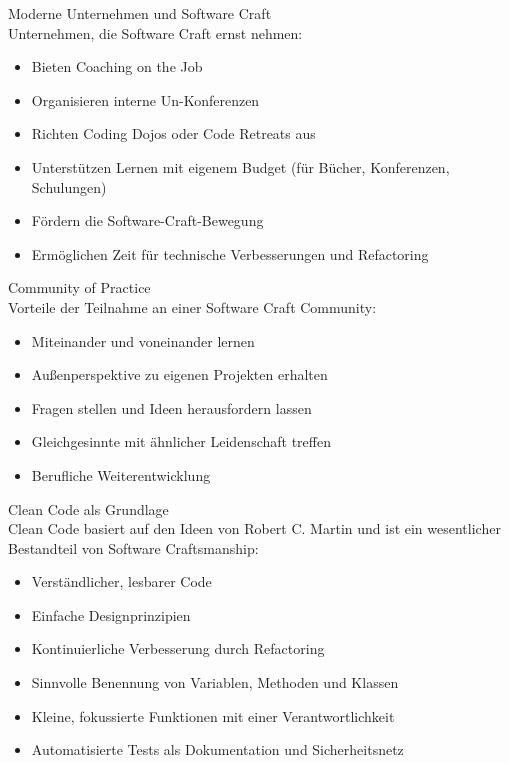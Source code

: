 \begin{concept}{Moderne Unternehmen und Software Craft}\\
    Unternehmen, die Software Craft ernst nehmen:
    \begin{itemize}
        \item Bieten Coaching on the Job
        \item Organisieren interne Un-Konferenzen
        \item Richten Coding Dojos oder Code Retreats aus
        \item Unterstützen Lernen mit eigenem Budget (für Bücher, Konferenzen, Schulungen)
        \item Fördern die Software-Craft-Bewegung
        \item Ermöglichen Zeit für technische Verbesserungen und Refactoring
    \end{itemize}
\end{concept}

\begin{concept}{Community of Practice}\\
    Vorteile der Teilnahme an einer Software Craft Community:
    \begin{itemize}
        \item Miteinander und voneinander lernen
        \item Außenperspektive zu eigenen Projekten erhalten
        \item Fragen stellen und Ideen herausfordern lassen
        \item Gleichgesinnte mit ähnlicher Leidenschaft treffen
        \item Berufliche Weiterentwicklung
    \end{itemize}
\end{concept}

\begin{concept}{Clean Code als Grundlage}\\
    Clean Code basiert auf den Ideen von Robert C. Martin und ist ein wesentlicher Bestandteil von Software Craftsmanship:
    \begin{itemize}
        \item Verständlicher, lesbarer Code
        \item Einfache Designprinzipien
        \item Kontinuierliche Verbesserung durch Refactoring
        \item Sinnvolle Benennung von Variablen, Methoden und Klassen
        \item Kleine, fokussierte Funktionen mit einer Verantwortlichkeit
        \item Automatisierte Tests als Dokumentation und Sicherheitsnetz
    \end{itemize}
\end{concept}

